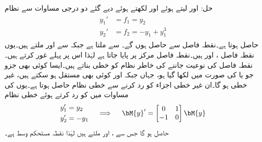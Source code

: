 حل: اور  لیتے ہوئے اور  لکھتے ہوئے دیے گئے دو درجی مساوات سے نظام
\begin{gather}
\begin{aligned}\label{مساوات_مثال_نظام_تفرقی_سے_نظام}
y_1'&=f_1=y_2\\
y_2'&=f_2=-y_1+y_1^3
\end{aligned}
\end{gather}
 حاصل ہوتا ہے۔نقطہ فاصل  سے حاصل ہوں گے۔ سے  ملتا ہے جبکہ  سے  اور  ملتے ہیں۔یوں نقطہ فاصل ،  اور  ہیں۔نقطہ فاصل  مرکز پر پایا جاتا ہے لہٰذا اس پر پہلے غور کرتے ہیں۔نقطہ فاصل کی نوعیت جاننے کی خاطر نظام کو خطی بناتے ہیں۔ایسا کوئی بھی جزو جو  یا  کی صورت میں لکھا گیا ہو، جہاں  جبکہ  اور  کوئی بھی  مستقل ہو سکتے ہیں، غیر خطی ہو گا۔ان غیر خطی اجزاء کو رد کرنے سے خطی نظام حاصل ہوتا ہے۔یوں  کی مساوات میں  کو رد کرتے ہوئے خطی نظام 
\begin{gather*}
\begin{aligned}
y_1'&=y_2\\
y_2'&=-y_1
\end{aligned}\quad \implies \quad
\begin{aligned}
\bM{y}'=\begin{bmatrix} 0&1\\-1&0 \end{bmatrix}\bM{y}
\end{aligned}
\end{gather*}
حاصل ہو گا جس سے  ،  اور  ملتے ہیں لہٰذا نقطہ  مستحکم وسط ہے۔

